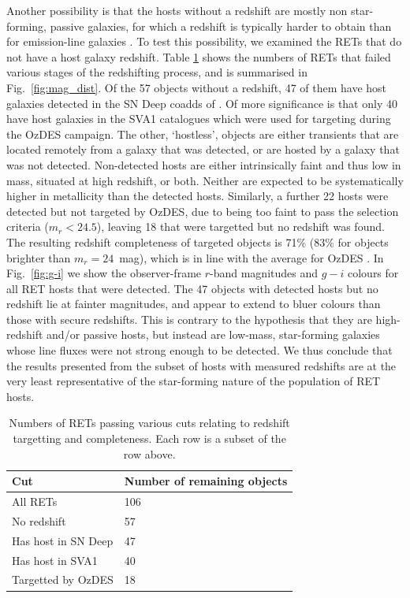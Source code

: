 \documentclass[fleqn,usenatbib,]{mnras}
\begin{document}
Another possibility is that the hosts without a redshift are mostly non star-forming, passive galaxies, for which a redshift is typically harder to obtain than for emission-line galaxies \citep{Yuan2015,Childress2017,Lidman2020}. To test this possibility, we examined the RETs that do not have a host galaxy redshift. Table \ref{tab:z_cuts} shows the numbers of RETs that failed various stages of the redshifting process, and is summarised in Fig.~\ref{fig:mag_dist}. Of the 57 objects without a redshift, 47 of them have host galaxies detected in the SN Deep coadds of . Of more significance is that only 40 have host galaxies in the SVA1 catalogues which were used for targeting during the OzDES campaign. The other, `hostless', objects are either transients that are located remotely from a galaxy that was detected, or are hosted by a galaxy that was not detected. Non-detected hosts are either intrinsically faint and thus low in mass, situated at high redshift, or both. Neither are expected to be systematically higher in metallicity than the detected hosts. Similarly, a further 22 hosts were detected but not targeted by OzDES, due to being too faint to pass the selection criteria ($m_r < 24.5$), leaving 18 that were targetted but no redshift was found. The resulting redshift completeness of targeted objects is 71\% (83\% for objects brighter than $m_r = 24$~mag), which is in line with the average for OzDES \citep{Lidman2020}.
In Fig.~\ref{fig:g-i} we show the observer-frame $r$-band magnitudes and $g-i$ colours for all RET hosts that were detected. The 47 objects with detected hosts but no redshift lie at fainter magnitudes, and appear to extend to bluer colours than those with secure redshifts. This is contrary to the hypothesis that they are high-redshift and/or passive hosts, but instead are low-mass, star-forming galaxies whose line fluxes were not strong enough to be detected. We thus conclude that the results presented from the subset of hosts with measured redshifts are at the very least representative of the star-forming nature of the population of RET hosts.
 

\begin{table}
    \centering
    \begin{tabular}{l|l}
         Cut &  Number of remaining objects \\
        \toprule
        All RETs & 106 \\
        No redshift   & 57\\
        Has host in SN Deep & 47\\
        Has host in SVA1 & 40 \\
        Targetted by OzDES & 18 \\
        \bottomrule
    \end{tabular}
    \caption{Numbers of RETs passing various cuts relating to redshift targetting and completeness. Each row is a subset of the row above.}
    \label{tab:z_cuts}
\end{table}
\end{document}
